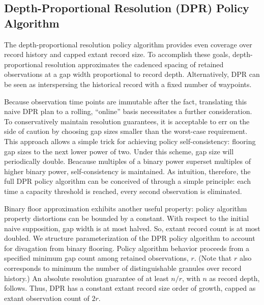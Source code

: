 \subsection{Depth-Proportional Resolution (DPR) Policy Algorithm}
\label{sec:depth-proportional-resolution-algo}

The depth-proportional resolution policy algorithm provides even coverage over record history and capped extant record size.
To accomplish these goals, depth-proportional resolution approximates the cadenced spacing of retained observations at a gap width proportional to record depth.
Alternatively, DPR can be seen as interspersing the historical record with a fixed number of waypoints.

Because observation time points are immutable after the fact, translating this naive DPR plan to a rolling, ``online'' basis necessitates a further consideration.
To conservatively maintain resolution guarantees, it is acceptable to err on the side of caution by choosing gap sizes smaller than the worst-case requirement.
This approach allows a simple trick for achieving policy self-consistency: flooring gap sizes to the next lower power of two.
Under this scheme, gap size will periodically double.
Beacause multiples of a binary power superset multiples of higher binary power, self-consistency is maintained.
As intuition, therefore, the full DPR policy algorithm can be conceived of through a simple principle: %
each time a capacity threshold is reached, every second observation is eliminated.

Binary floor approximation exhibits another useful property: policy algorithm property distortions can be bounded by a constant.
With respect to the initial naive supposition, gap width is at most halved.
So, extant record count is at most doubled.
We structure parameterization of the DPR policy algorithm to account for divagation from binary flooring.
Policy algorithm behavior proceeds from a specified minimum gap count among retained observations, $r$.
(Note that $r$ also corresponds to minimum the number of distinguishable granules over record history.)
An absolute resolution guarantee of at least $n/r$, with $n$ as record depth, follows.
Thus, DPR has a constant extant record size order of growth, capped as extant observation count of $2r$.

